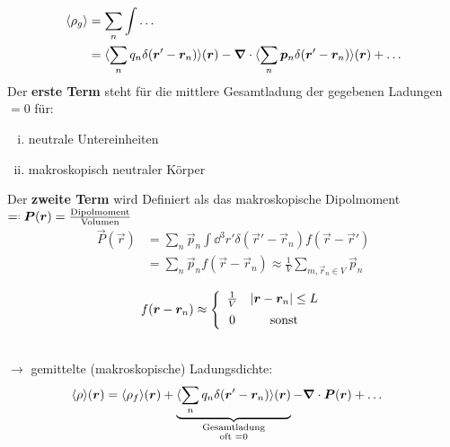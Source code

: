 \noindent
\begin{align*}
\langle \rho_g \rangle &= \sum_n \int \dots \\
&= \langle \sum_n q_n \delta(\bm{r}' - \bm{r}_n) \rangle (\bm{r}) - \bm{\nabla} \cdot \langle \sum_n \bm{p}_n \delta(\bm{r}' - \bm{r}_n) \rangle(\bm{r}) + \dots
\end{align*}
Der \textbf{erste Term} steht für die mittlere Gesamtladung der gegebenen Ladungen $ = 0 $ für:
\begin{enumerate}[i)]
	\item neutrale Untereinheiten
	\item makroskopisch neutraler Körper
\end{enumerate}
Der \textbf{zweite Term} wird Definiert als das makroskopische Dipolmoment $ \eqdef \vec{P} (\vec{r}) = \frac{\tx{Dipolmoment}}{\tx{Volumen}} $
\begin{align}
\vec{P}(\vec{r}) &= \sum_n \vec{p}_n \int \dd^3r' \delta(\vec{r}' - \vec{r}_n) f(\vec{r} - \vec{r}')\\
&= \sum_n \vec{p}_n f(\vec{r} - \vec{r}_n) \approx \frac{1}{V} \sum_{m,\vec{r}_n \in V} \vec{p}_n
\end{align}
\begin{minipage}{.5\linewidth}
	\begin{equation*}
	f(\bm{r} - \bm{r}_n) \approx \left\{ \begin{array}{cc}
	\frac{1}{V} & |\bm{r} - \bm{r}_n| \le L \\[5pt]
	0 & \textrm{sonst}
	\end{array}\right.
	\end{equation*}
\end{minipage}%
\begin{minipage}{.5\linewidth}
	\centering
\end{minipage}%
\\
$ \rightarrow $ gemittelte (makroskopische) Ladungsdichte:
\begin{align*}
\langle \rho \rangle (\bm{r}) &= \langle \rho_f \rangle(\bm{r}) + \underbrace{\langle \sum_n q_n \delta(\bm{r}' - \bm{r}_n) \rangle(\bm{r})}_{\substack{\textrm{Gesamtladung} \\ \textrm{oft } = 0}} - \bm{\nabla} \cdot \bm{P}(\bm{r}) + \dots
\end{align*}

